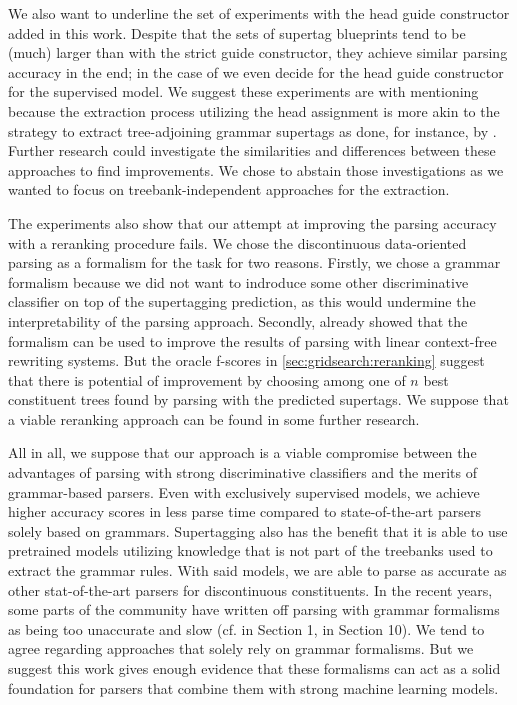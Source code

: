 \documentclass[../document.tex]{subfiles}
\begin{document}
    We also want to underline the set of experiments with the head guide constructor added in this work.
    Despite that the sets of supertag blueprints tend to be (much) larger than with the strict guide constructor, they achieve similar parsing accuracy in the end; in the case of  we even decide for the head guide constructor for the supervised model.
    We suggest these experiments are with mentioning because the extraction process utilizing the head assignment is more akin to the strategy to extract tree-adjoining grammar supertags as done, for instance, by \cite{Kaeshammer2012GermanAE, Bla18}.
    Further research could investigate the similarities and differences between these approaches to find improvements.
    We chose to abstain those investigations as we wanted to focus on treebank-independent approaches for the extraction.

    The experiments also show that our attempt at improving the parsing accuracy with a reranking procedure fails.
    We chose the discontinuous data-oriented parsing as a formalism for the task for two reasons.
        Firstly, we chose a grammar formalism because we did not want to indroduce some other discriminative classifier on top of the supertagging prediction, as this would undermine the interpretability of the parsing approach.
        Secondly, \citet{CraSchBod16} already showed that the formalism can be used to improve the results of parsing with linear context-free rewriting systems.
    But the oracle f-scores in \cref{sec:gridsearch:reranking} suggest that there is potential of improvement by choosing among one of \(n\) best constituent trees found by parsing with the predicted supertags.
    We suppose that a viable reranking approach can be found in some further research.

    All in all, we suppose that our approach is a viable compromise between the advantages of parsing with strong discriminative classifiers and the merits of grammar-based parsers.
    Even with exclusively supervised models, we achieve higher accuracy scores in less parse time compared to state-of-the-art parsers solely based on grammars.
    Supertagging also has the benefit that it is able to use pretrained models utilizing knowledge that is not part of the treebanks used to extract the grammar rules.
    With said models, we are able to parse as accurate as other stat-of-the-art parsers for discontinuous constituents.
    In the recent years, some parts of the  community have written off parsing with grammar formalisms as being too unaccurate and slow (cf. \citealp{StaSte20} in Section 1, \citealp{zhang2020survey} in Section 10).
    We tend to agree regarding approaches that solely rely on grammar formalisms.
    But we suggest this work gives enough evidence that these formalisms can act as a solid foundation for parsers that combine them with strong machine learning models.
\end{document}

